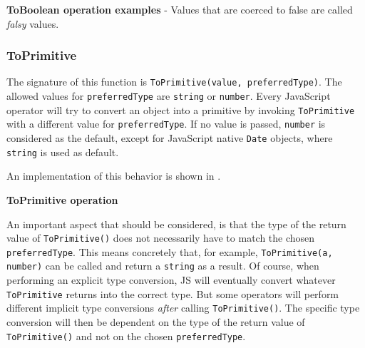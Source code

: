 \begin{code}
	\captionsetup{aboveskip=0pt, belowskip=10pt}
	\caption[ToBoolean operation examples]{\textbf{ToBoolean operation examples} - Values that are coerced to false are called \textit{falsy} values.}
	\label{code:background-to-boolean-operation}
\end{code}

\subsubsection{ToPrimitive}
The signature of this function is \texttt{ToPrimitive(value, preferredType)}. The allowed values for \texttt{preferredType} are \texttt{string} or \texttt{number}. Every JavaScript operator will try to convert an object into a primitive by invoking \texttt{ToPrimitive} with a different value for \texttt{preferredType}. If no value is passed, \texttt{number} is considered as the default, except for JavaScript native \texttt{Date} objects, where \texttt{string} is used as default.

An implementation of this behavior is shown in .

\begin{code}
	\captionsetup{aboveskip=0pt, belowskip=10pt}
	\caption[ToPrimitive operation]{\textbf{ToPrimitive operation}}
	\label{code:background-to-primitive-operation}
\end{code}

An important aspect that should be considered, is that the type of the return value of \texttt{ToPrimitive()} does not necessarily have to match the chosen \texttt{preferredType}. This means concretely that, for example, \texttt{ToPrimitive(a, number)} can be called and return a \texttt{string} as a result. Of course, when performing an explicit type conversion, JS will eventually convert whatever \texttt{ToPrimitive} returns into the correct type. But some operators will perform different implicit type conversions \textit{after} calling \texttt{ToPrimitive()}. The specific type conversion will then be dependent on the type of the return value of \texttt{ToPrimitive()} and not on the chosen \texttt{preferredType}.


